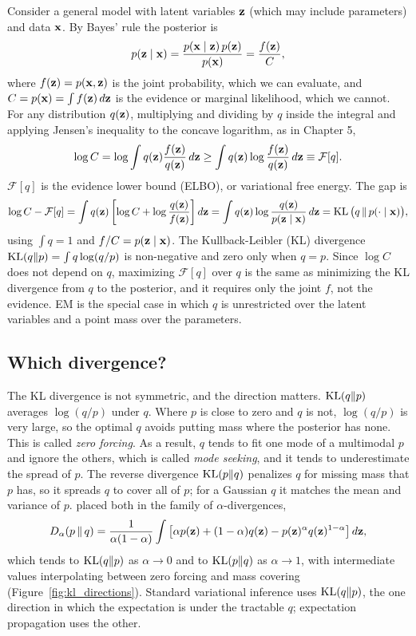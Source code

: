 Consider a general model with latent variables $\mathbf{z}$ (which may include parameters) and data $\mathbf{x}$. By Bayes' rule the posterior is
\begin{equation}
  p(\mathbf{z}\mid\mathbf{x}) = \frac{p(\mathbf{x}\mid\mathbf{z})\,p(\mathbf{z})}{p(\mathbf{x})} = \frac{f(\mathbf{z})}{C},
\end{equation}
where $f(\mathbf{z})=p(\mathbf{x},\mathbf{z})$ is the joint probability, which we can evaluate, and $C=p(\mathbf{x})=\int f(\mathbf{z})\,d\mathbf{z}$ is the evidence or marginal likelihood, which we cannot. For any distribution $q(\mathbf{z})$, multiplying and dividing by $q$ inside the integral and applying Jensen's inequality to the concave logarithm, as in Chapter 5,
\begin{equation}
  \log C = \log\int q(\mathbf{z})\frac{f(\mathbf{z})}{q(\mathbf{z})}\,d\mathbf{z} \geq \int q(\mathbf{z})\log\frac{f(\mathbf{z})}{q(\mathbf{z})}\,d\mathbf{z} \equiv \mathcal{F}[q] .
\end{equation}
$\mathcal{F}[q]$ is the evidence lower bound (ELBO), or variational free energy. The gap is
\begin{equation}
  \log C - \mathcal{F}[q] = \int q(\mathbf{z})\left[\log C + \log\frac{q(\mathbf{z})}{f(\mathbf{z})}\right]d\mathbf{z} = \int q(\mathbf{z})\log\frac{q(\mathbf{z})}{p(\mathbf{z}\mid\mathbf{x})}\,d\mathbf{z} = \operatorname{KL}\big(q\,\|\,p(\cdot\mid\mathbf{x})\big),
  \label{eq:vi_gap}
\end{equation}
using $\int q=1$ and $f/C=p(\mathbf{z}\mid\mathbf{x})$. The Kullback-Leibler (KL) divergence $\operatorname{KL}(q\|p)=\int q\log(q/p)$ is non-negative and zero only when $q=p$. Since $\log C$ does not depend on $q$, maximizing $\mathcal{F}[q]$ over $q$ is the same as minimizing the KL divergence from $q$ to the posterior, and it requires only the joint $f$, not the evidence. EM is the special case in which $q$ is unrestricted over the latent variables and a point mass over the parameters.

\subsection{Which divergence?}

The KL divergence is not symmetric, and the direction matters. $\operatorname{KL}(q\|p)$ averages $\log(q/p)$ under $q$. Where $p$ is close to zero and $q$ is not, $\log(q/p)$ is very large, so the optimal $q$ avoids putting mass where the posterior has none. This is called \emph{zero forcing}. As a result, $q$ tends to fit one mode of a multimodal $p$ and ignore the others, which is called \emph{mode seeking}, and it tends to underestimate the spread of $p$. The reverse divergence $\operatorname{KL}(p\|q)$ penalizes $q$ for missing mass that $p$ has, so it spreads $q$ to cover all of $p$; for a Gaussian $q$ it matches the mean and variance of $p$. \citet{minka2005} placed both in the family of $\alpha$-divergences,
\begin{equation}
  D_\alpha(p\,\|\,q) = \frac{1}{\alpha(1-\alpha)}\int\left[\alpha p(\mathbf{z})+(1-\alpha)q(\mathbf{z})-p(\mathbf{z})^\alpha q(\mathbf{z})^{1-\alpha}\right]d\mathbf{z},
\end{equation}
which tends to $\operatorname{KL}(q\|p)$ as $\alpha\to 0$ and to $\operatorname{KL}(p\|q)$ as $\alpha\to 1$, with intermediate values interpolating between zero forcing and mass covering (Figure~\ref{fig:kl_directions}). Standard variational inference uses $\operatorname{KL}(q\|p)$, the one direction in which the expectation is under the tractable $q$; expectation propagation uses the other.

